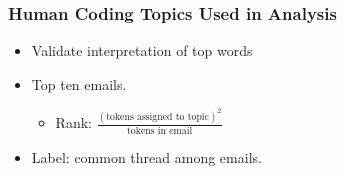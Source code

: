 \documentclass[xcolor={table}, fleqn]{beamer}
\begin{document}
\begin{frame}\frametitle{Human Coding Topics Used in Analysis}
	\LARGE
	\begin{itemize}
		\item Validate interpretation of top words
		\vspace*{.4in}
		\item Top ten emails.
		\vspace*{.2in}
		\begin{itemize}
			\LARGE
			\item Rank: $\frac{(\text{tokens assigned to topic})^2}{\text{tokens in email}}$
		\end{itemize}
		\vspace*{.2in}
		\item Label: common thread among emails.
	\end{itemize}
\end{frame}
\end{document}
